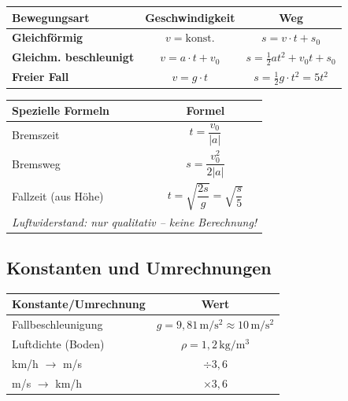 \documentclass[11pt,a4paper]{article}
\begin{document}
\begin{center}
\renewcommand{\arraystretch}{1.6}
\begin{tabular}{|p{4cm}|c|c|}
\hline
\rowcolor{lightblue}
\textbf{Bewegungsart} & \textbf{Geschwindigkeit} & \textbf{Weg} \\
\hline
\textbf{Gleichförmig} & $v = \text{konst.}$ & $s = v \cdot t + s_0$ \\
\hline
\textbf{Gleichm. beschleunigt} & $v = a \cdot t + v_0$ & $s = \frac{1}{2}at^2 + v_0 t + s_0$ \\
\hline
\textbf{Freier Fall} & $v = g \cdot t$ & $s = \frac{1}{2}g \cdot t^2 = 5t^2$ \\
\hline
\end{tabular}
\end{center}

\vspace{0.5cm}

\begin{center}
\renewcommand{\arraystretch}{1.6}
\begin{tabular}{|l|c|}
\hline
\rowcolor{lightblue}
\textbf{Spezielle Formeln} & \textbf{Formel} \\
\hline
Bremszeit & $t = \dfrac{v_0}{|a|}$ \\
\hline
Bremsweg & $s = \dfrac{v_0^2}{2|a|}$ \\
\hline
Fallzeit (aus Höhe) & $t = \sqrt{\dfrac{2s}{g}} = \sqrt{\dfrac{s}{5}}$ \\
\hline
\hline
\multicolumn{2}{|l|}{\textit{Luftwiderstand: nur qualitativ -- keine Berechnung!}} \\
\hline
\end{tabular}
\end{center}

\subsection{Konstanten und Umrechnungen}

\begin{center}
\begin{tabular}{|l|c|}
\hline
\rowcolor{lightblue}
\textbf{Konstante/Umrechnung} & \textbf{Wert} \\
\hline
Fallbeschleunigung & $g = 9{,}81\,\mathrm{m/s^2} \approx 10\,\mathrm{m/s^2}$ \\
\hline
Luftdichte (Boden) & $\rho = 1{,}2\,\mathrm{kg/m^3}$ \\
\hline
km/h $\rightarrow$ m/s & $\div 3{,}6$ \\
\hline
m/s $\rightarrow$ km/h & $\times 3{,}6$ \\
\hline
\end{tabular}
\end{center}
\end{document}
